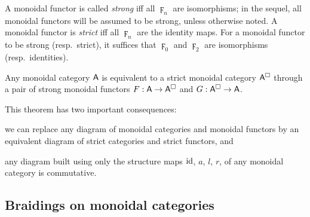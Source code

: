 A monoidal functor is called \emph{strong} iff all $\digamma_n$ are
isomorphisms; in the sequel, all monoidal functors will be assumed to
be strong, unless otherwise noted. A monoidal functor is \emph{strict}
iff all $\digamma_n$ are the identity maps. For a monoidal functor to be
strong (resp.\ strict), it suffices that $\digamma_0$ and $\digamma_2$ are
isomorphisms (resp.\ identities).

\begin{theorem*}
  Any monoidal category $\mathsf{A}$ is equivalent to a strict monoidal
  category $\mathsf{A}^\Box$ through a pair of strong monoidal functors $F: \mathsf{A}
  \to \mathsf{A}^\Box$ and $G: \mathsf{A}^\Box \to \mathsf{A}$.  
\end{theorem*}
This theorem has two important consequences:
\begin{inparaenum}
\item
  we can replace any diagram of monoidal categories and monoidal
  functors by an equivalent diagram of strict categories and strict
  functors, and 
\item any diagram built using only the structure maps $\operatorname{id}$, $a$, $l$,
  $r$, of any monoidal category is commutative.
\end{inparaenum}


\subsection{Braidings on monoidal categories}
\label{sec:braidings}

